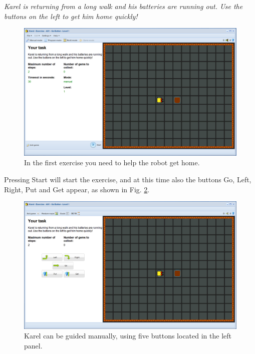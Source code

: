 \documentclass[article,A4,12pt]{llncs}
\begin{document}
{\em Karel is returning from a long walk and his batteries are running out. 
Use the buttons on the left to get him home quickly! }
\begin{figure}[!ht]
\begin{center}
\includegraphics[height=0.4\textwidth]{imgk/a01.png}
\end{center}
\vspace{-4mm}
\caption{In the first exercise you need to help the robot get home.}
\label{fig:a01}
\end{figure}

\noindent
Pressing Start will start 
the exercise, and at this time also the buttons Go, Left, Right, Put and Get appear, 
as shown in Fig. \ref{fig:a01b}.


\begin{figure}[!ht]
\begin{center}
\includegraphics[height=0.4\textwidth]{imgk/a01b.png}
\end{center}
\vspace{-4mm}
\caption{Karel can be guided manually, using five buttons located in the left panel.}
\label{fig:a01b}
\vspace{-10mm}
\end{figure}

\newpage
\subsection{}
\end{document}
